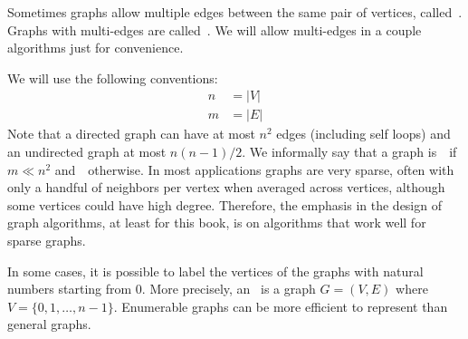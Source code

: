 \begin{cluster}
\label{grp:def:bg::graphs::multigraphs}

\begin{definition}[Multigraphs]
\label{def:bg::graphs::multigraphs}
Sometimes graphs allow multiple edges between the same pair of
vertices, called~.  Graphs with multi-edges are
called~.  We will allow multi-edges in a couple
algorithms just for convenience.

\end{definition}
\end{cluster}

\begin{cluster}
\label{grp:def:bg::graphs::sparse-and-dense-graphs}

\begin{definition}
\label{def:bg::graphs::sparse-and-dense-graphs}
We will use the following conventions:
\begin{eqnarray*}
n & = |V|\\
m & = |E|
\end{eqnarray*}
Note that a directed graph can have at most $n^2$ edges (including self loops)
and an undirected graph at most $n(n-1)/2$.  We informally say that a graph
is~~if $m \ll n^2$ and~~otherwise.  In most
applications graphs are very sparse, often with only a handful of neighbors per
vertex when averaged across vertices, although some vertices could have high
degree.  Therefore, the emphasis in the design of graph algorithms, at least for
this book, is on algorithms that work well for sparse graphs.

\end{definition}
\end{cluster}

\begin{cluster}
\label{grp:def:bg::graphs::basics::enumerable}

\begin{definition}
\label{def:bg::graphs::basics::enumerable}
In some cases, it is possible to label the vertices of the graphs with
natural numbers starting from $0$.  More precisely, an~ is a graph $G = (V,E)$ where $V =
\{0,1,\ldots,n-1\}$.
Enumerable graphs can be more efficient to represent than
general graphs.

\end{definition}
\end{cluster}


